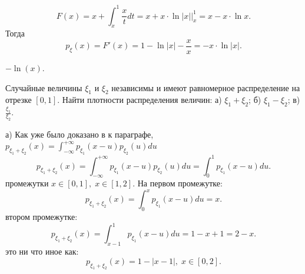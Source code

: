\begin{solution}
\[
F(x) = x + \int_x^1 \frac{x}{t} dt = x + x \cdot \ln|x|\bigg|_x^1 = x - x \cdot  \ln x
.\] Тогда \[
p_\xi(x) = F'(x) = 1 - \ln|x| - \frac{x}{x} = - x \cdot  \ln|x|
.\] 
\begin{center}
\end{center}
\end{solution}

\begin{result}
$-\ln(x)$.
\end{result}

\medskip
\begin{task}{7}
  Случайные величины $\xi_1$ и $\xi_2$ независимы и имеют равномерное распределение на отрезке $\left[
  0, 1\right]$. Найти плотности распределения величин: а) $\xi_1 + \xi_2$; б) $\xi_1 - \xi_2$; в) $\frac{\xi_1}{\xi_2}$.
\end{task}

\begin{subtask}{а)}
Как уже было доказано в к параграфе, $p_{\xi_1 + \xi_2}(x) = \int_{-\infty}^{+\infty} p_{\xi_1}(x - u)
p_{\xi_2}(u) du$ 
\[
p_{\xi_1 + \xi_2}(x) = \int_{-\infty}^{+\infty} p_{\xi_1}(x - u) p_{\xi_2}(u) du = \int_0^1
p_{\xi_1}(x - u) du
.\] 
 промежутки $x \in [0, 1], \; x \in [1, 2]$. На первом промежутке: 
\[
  p_{\xi_1 + \xi_2}(x) = \int_0^x p_{\xi_1}(x - u) du = x
.\] 
 втором промежутке:
\[
p_{\xi_1 + \xi_2}(x) = \int_{x - 1}^1 p_{\xi_1}(x - u) du = 1 - x + 1 = 2 - x
.\] 
 это ни что иное как: \[
  p_{\xi_1 + \xi_2}(x) = 1 - |x - 1|, \; x \in [0, 2]
.\] 
\end{subtask}

